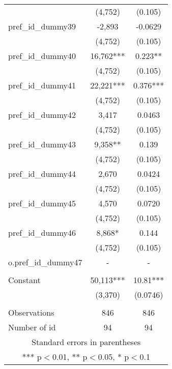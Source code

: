 \documentclass[]{article}
\begin{document}
\begin{tabular}{lcc}
 & (4,752) & (0.105) \\
pref\_id\_dummy39 & -2,893 & -0.0629 \\
 & (4,752) & (0.105) \\
pref\_id\_dummy40 & 16,762*** & 0.223** \\
 & (4,752) & (0.105) \\
pref\_id\_dummy41 & 22,221*** & 0.376*** \\
 & (4,752) & (0.105) \\
pref\_id\_dummy42 & 3,417 & 0.0463 \\
 & (4,752) & (0.105) \\
pref\_id\_dummy43 & 9,358** & 0.139 \\
 & (4,752) & (0.105) \\
pref\_id\_dummy44 & 2,670 & 0.0424 \\
 & (4,752) & (0.105) \\
pref\_id\_dummy45 & 4,570 & 0.0720 \\
 & (4,752) & (0.105) \\
pref\_id\_dummy46 & 8,868* & 0.144 \\
 & (4,752) & (0.105) \\
o.pref\_id\_dummy47 & - & - \\
 &  &  \\
Constant & 50,113*** & 10.81*** \\
 & (3,370) & (0.0746) \\
 &  &  \\
Observations & 846 & 846 \\
 Number of id & 94 & 94 \\ \hline
\multicolumn{3}{c}{ Standard errors in parentheses} \\
\multicolumn{3}{c}{ *** p$<$0.01, ** p$<$0.05, * p$<$0.1} \\
\end{tabular}
\end{document}
